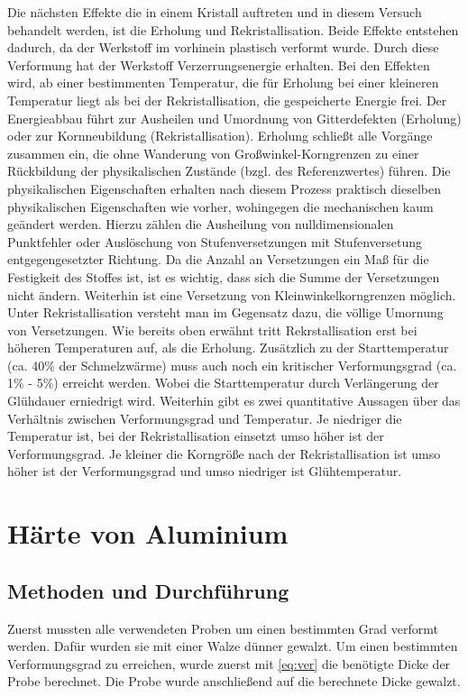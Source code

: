 \documentclass[
	a4paper,
	12pt,
	pagesize,
	ngerman
]{scrartcl}
\begin{document}
Die nächsten Effekte die in einem Kristall auftreten und in diesem Versuch behandelt werden, ist die Erholung und Rekristallisation. 
Beide Effekte entstehen dadurch, da der Werkstoff im vorhinein plastisch verformt wurde. Durch diese Verformung hat der Werkstoff Verzerrungsenergie erhalten. Bei den Effekten wird, ab einer bestimmenten Temperatur, die für Erholung bei einer kleineren Temperatur liegt als bei der Rekristallisation, die gespeicherte Energie frei. Der Energieabbau führt zur Ausheilen und Umordnung von Gitterdefekten (Erholung) oder zur Kornneubildung (Rekristallisation).
Erholung schließt alle Vorgänge zusammen ein, die ohne Wanderung von Großwinkel-Korngrenzen zu einer Rückbildung der physikalischen Zustände (bzgl. des Referenzwertes) führen.
Die physikalischen Eigenschaften erhalten nach diesem Prozess praktisch dieselben physikalischen Eigenschaften wie vorher, wohingegen die mechanischen kaum geändert werden. Hierzu zählen die Ausheilung von nulldimensionalen Punktfehler oder Auslöschung von  Stufenversetzungen mit Stufenversetung entgegengesetzter Richtung. Da die Anzahl an Versetzungen ein Maß für die Festigkeit des Stoffes ist, ist es wichtig, dass sich die Summe der Versetzungen nicht ändern. Weiterhin ist eine Versetzung von Kleinwinkelkorngrenzen möglich. 
Unter Rekristallisation versteht man im Gegensatz dazu, die völlige Umornung von Versetzungen.
Wie bereits oben erwähnt tritt Rekrstallisation erst bei höheren Temperaturen auf, als die Erholung. Zusätzlich zu der Starttemperatur (ca. 40\% der Schmelzwärme) muss auch noch ein kritischer Verformungsgrad (ca. 1\% - 5\%) erreicht werden. Wobei die Starttemperatur durch Verlängerung der Glühdauer erniedrigt wird. Weiterhin gibt es zwei quantitative Aussagen über das Verhältnis zwischen Verformungsgrad und Temperatur.
Je niedriger die Temperatur ist, bei der Rekristallisation einsetzt umso höher ist der Verformungsgrad.  
Je kleiner die Korngröße nach der Rekristallisation ist umso höher ist der Verformungsgrad und umso niedriger ist Glühtemperatur.  
 


\section{Härte von Aluminium}
\subsection{Methoden und Durchführung}
Zuerst mussten alle verwendeten Proben um einen bestimmten Grad verformt werden. Dafür wurden sie mit einer Walze dünner gewalzt. Um einen bestimmten Verformungsgrad zu erreichen, wurde zuerst mit \cref{eq:ver} die benötigte Dicke der Probe berechnet. Die Probe wurde anschließend auf die berechnete Dicke gewalzt.
\end{document}
